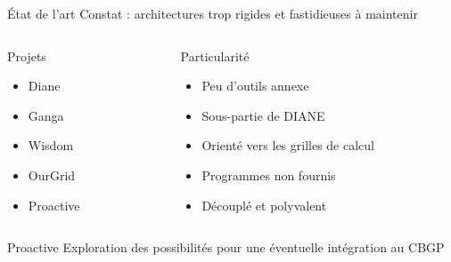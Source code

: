 \documentclass{beamer}
\begin{document}
\begin{frame}{État de l'art}
    Constat : architectures trop rigides et fastidieuses à maintenir
	\begin{columns}
	\begin{column}[l]{0.3\linewidth}
    \begin{block}{Projets}
        \begin{itemize}
            \item<2-> Diane
            \item<3-> Ganga
            \item<4-> Wisdom
            \item<5-> OurGrid
            \item<6-> Proactive
        \end{itemize}
    \end{block}
	\end{column}
	\begin{column}[r]{0.6\linewidth}
    \begin{exampleblock}{Particularité}
        \begin{itemize}
            \item<2-> Peu d'outils annexe
            \item<3-> Sous-partie de DIANE
            \item<4-> Orienté vers les grilles de calcul
            \item<5-> Programmes non fournis
            \item<6-> Découplé et polyvalent
        \end{itemize}
    \end{exampleblock}
	\end{column}
	\end{columns}
\end{frame}

\begin{frame}{Proactive}
    Exploration des possibilités pour une éventuelle intégration au CBGP
\end{frame}
\end{document}
